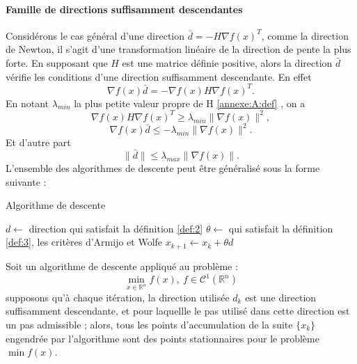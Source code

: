 \paragraph{Famille de directions suffisamment descendantes}
Consid\'erons le cas g\'en\'eral d'une direction $\bar{d}=-H\nabla f(x)^T$, comme la direction de Newton, il s'agit d'une
transformation lin\'eaire de la direction de pente la plus forte. En supposant que $H$ est 
une matrice d\'efinie positive, alors la direction $\bar{d}$ v\'erifie les conditions d'une direction suffisamment 
descendante. En effet
$$\nabla f(x)\bar{d}=-\nabla f(x)H\nabla f(x)^T.$$
En notant $\lambda_{min}$ la plus petite valeur propre de H \ref{annexe:A:def} , on a
$$\nabla f(x)H\nabla f(x)^T \geq \lambda_{min} \lVert \nabla f(x)\rVert^2,$$
$$\nabla f(x)\bar{d}\leq -\lambda_{min}\lVert \nabla f(x)\rVert^2.$$
Et d'autre part $$\lVert \bar{d}\rVert \leq \lambda_{max}\lVert \nabla f(x)\rVert.$$
L'ensemble des algorithmes de descente peut être g\'en\'eralis\'e sous la forme suivante : %
\begin{algorithm}                     %
\caption{Algorithme de descente}          %
\label{alg:1}                           %
\begin{algorithmic}  
\STATE $d \leftarrow$  direction qui satisfait la d\'efinition \ref{def:2}
\STATE $\theta \leftarrow$  qui satisfait la d\'efinition \ref{def:3}, les crit\`eres d'Armijo et Wolfe
\STATE $x_{k+1} \leftarrow x_k+\theta d$
\ENDWHILE
\end{algorithmic}
\end{algorithm}


\begin{frtheoreme}
Soit un algorithme de descente appliqu\'e au probl\`eme :\\
$$\min_{x\in \mathbb{R}^n} f(x), \ f \in \mathcal{C}^1(\mathbb{R}^n)$$
supposons qu'\`a chaque it\'eration, la direction utilis\'ee $d_k$ est une direction suffisamment descendante,
 et pour laquellle le pas utilis\'e dans cette direction est un pas admissible ; alors, tous les points
d’accumulation de la suite $\{x_k\}$ engendr\'ee par l'algorithme sont des points stationnaires pour le
probl\`eme $\min f(x)$.
\end{frtheoreme}




